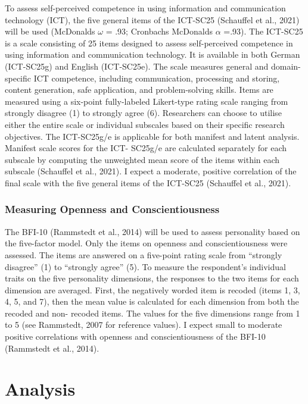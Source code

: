 \documentclass[
  12pt,
  a4paper,
  twoside]{article}
\begin{document}
To assess self-perceived competence in using information and
communication technology (ICT), the five general items of the ICT-SC25 (Schauffel
et al., 2021) will be used (McDonalds \(\omega\) = .93; Cronbachs McDonalds \(\alpha\) =.93). The ICT-SC25 is a scale consisting of 25 items designed to
assess self-perceived competence in using information and communication
technology. It is available in both German (ICT-SC25g) and English (ICT-SC25e). The
scale measures general and domain-specific ICT competence, including
communication, processing and storing, content generation, safe application, and
problem-solving skills. Items are measured using a six-point fully-labeled Likert-type
rating scale ranging from strongly disagree (1) to strongly agree (6). Researchers can choose to
utilise either the entire scale or individual subscales based on their specific research objectives. The ICT-SC25g/e
is applicable for both manifest and latent analysis. Manifest scale scores for the ICT-
SC25g/e are calculated separately for each subscale by computing the unweighted
mean score of the items within each subscale (Schauffel et al., 2021). I expect a moderate, positive correlation of the final scale with the five general items of the ICT-SC25 (Schauffel et al., 2021).

\subsubsection{Measuring Openness and Conscientiousness}\label{measuring-openness-and-conscientiousness}

The BFI-10 (Rammstedt et al., 2014) will be used to assess
personality based on the five-factor model. Only the items on openness and
conscientiousness were assessed.
The items are answered on a five-point rating scale from ``strongly disagree'' (1) to
``strongly agree'' (5). To measure the respondent's individual traits on the five
personality dimensions, the responses to the two items for each dimension are
averaged. First, the negatively worded item is recoded (items 1, 3, 4, 5, and 7), then
the mean value is calculated for each dimension from both the recoded and non-
recoded items. The values for the five dimensions range from 1 to 5 (see
Rammstedt, 2007 for reference values). I expect small to moderate positive correlations with openness and conscientiousness of the BFI-10 (Rammstedt et al., 2014).

\section{Analysis}\label{analysis}
\end{document}
